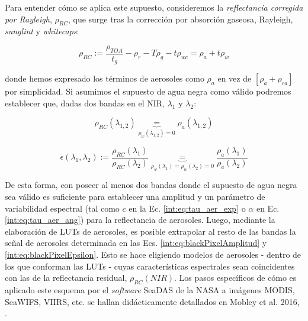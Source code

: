             Para entender cómo se aplica este supuesto, consideremos la \textit{reflectancia corregida por Rayleigh}, $\rho_{RC}$, que surge tras la corrección por absorción gaseosa, Rayleigh, \textit{sunglint} y \textit{whitecaps}:
            
            \begin{equation}
                \rho_{RC}:=\frac{\rho_{TOA}}{t_{g}}-\rho_{r}-T\rho_{g}-t\rho_{wc} = \rho_{a} + t\rho_{w}
                \label{int:eq:rhoResGW94}
            \end{equation}
            
            \noindent donde hemos expresado los términos de aerosoles como $\rho_{a}$ en vez de $[\rho_{a}+\rho_{ra}]$ por simplicidad. Si asumimos el supuesto de agua negra como válido podremos establecer que, dadas dos bandas en el NIR, $\lambda_{1}$ y $\lambda_{2}$:

            \begin{equation}
                \rho_{RC}(\lambda_{1,2}) \underbrace{=}_{\rho_{w}(\lambda_{1,2})=0} \rho_{a}(\lambda_{1,2})
                \label{int:eq:blackPixelAmplitud}
            \end{equation}

            \begin{equation}
                \epsilon(\lambda_{1},\lambda_{2}):=\frac{\rho_{RC}(\lambda_{1})}{\rho_{RC}(\lambda_{2})} \underbrace{=}_{\rho_{w}(\lambda_{1})=\rho_{w}(\lambda_{2})=0} \frac{\rho_{a}(\lambda_{1})}{\rho_{a}(\lambda_{2})}
                \label{int:eq:blackPixelEpsilon}
            \end{equation}
            
            De esta forma, con poseer al menos dos bandas donde el supuesto de agua negra sea válido es suficiente para establecer una amplitud y un parámetro de variabilidad espectral (tal como $c$ en la Ec. \ref{int:eq:tau_aer_exp} o $\alpha$ en Ec. \ref{int:eq:tau_aer_ang}) para la reflectancia de aerosoles. Luego, mediante la elaboración de LUTs de aerosoles, es posible extrapolar al resto de las bandas la señal de aerosoles determinada en las Ecs. \ref{int:eq:blackPixelAmplitud} y \ref{int:eq:blackPixelEpsilon}. Esto se hace eligiendo modelos de aerosoles - dentro de los que conforman las LUTs - cuyas características espectrales sean coincidentes con las de la reflectancia residual, $\rho_{RC}(NIR)$. Los pasos específicos de cómo es aplicado este esquema por el \textit{software} SeaDAS de la NASA a imágenes MODIS, SeaWIFS, VIIRS, etc. se hallan didácticamente detallados en Mobley et al. 2016, \cite{mobley2016}.

